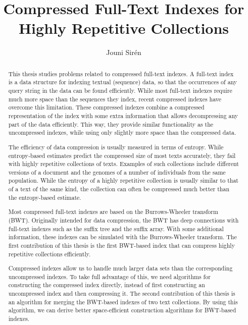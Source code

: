 \documentclass[officiallayout]{tktla}
\title{Compressed Full-Text Indexes for Highly Repetitive Collections}
\author{Jouni Sirén}
\theoremstyle{definition}
\theoremstyle{remark}
\begin{document}
\frontmatter

\maketitle

\begin{abstract}
This thesis studies problems related to compressed full-text indexes. A full-text index is a data structure for indexing textual (sequence) data, so that the occurrences of any query string in the data can be found efficiently. While most full-text indexes require much more space than the sequences they index, recent compressed indexes have overcome this limitation. These compressed indexes combine a compressed representation of the index with some extra information that allows decompressing any part of the data efficiently. This way, they provide similar functionality as the uncompressed indexes, while using only slightly more space than the compressed data.

The efficiency of data compression is usually measured in terms of entropy. While entropy-based estimates predict the compressed size of most texts accurately, they fail with highly repetitive collections of texts. Examples of such collections include different versions of a document and the genomes of a number of individuals from the same population. While the entropy of a highly repetitive collection is usually similar to that of a text of the same kind, the collection can often be compressed much better than the entropy-based estimate.

Most compressed full-text indexes are based on the Burrows-Wheeler transform (BWT). Originally intended for data compression, the BWT has deep connections with full-text indexes such as the suffix tree and the suffix array. With some additional information, these indexes can be simulated with the Burrows-Wheeler transform. The first contribution of this thesis is the first BWT-based index that can compress highly repetitive collections efficiently.

Compressed indexes allow us to handle much larger data sets than the corresponding uncompressed indexes. To take full advantage of this, we need algorithms for constructing the compressed index directly, instead of first constructing an uncompressed index and then compressing it. The second contribution of this thesis is an algorithm for merging the BWT-based indexes of two text collections. By using this algorithm, we can derive better space-efficient construction algorithms for BWT-based indexes.


\end{abstract}
\end{document}
